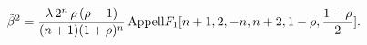 \begin{equation}
\tilde{\beta}^2=\frac{\lambda\,2^{n}\,\rho\,(\rho-1)}{(n+1)(1+\rho)^{n}}\,{\rm{Appell}}F_{1}[n+1,2,-n,n+2,1-\rho,\frac{1-\rho}{2}].\label{app1}
\end{equation}

